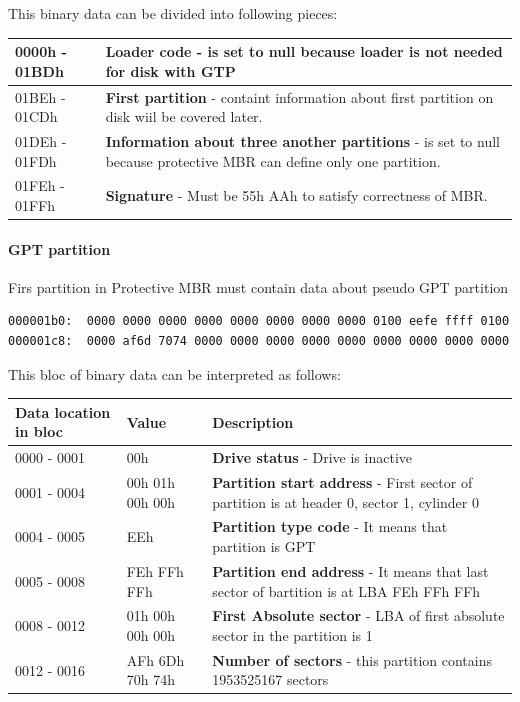 \documentclass[a4paper,11pt]{article}
\theoremstyle{mytheor}
\begin{document}
This binary data can be divided into following pieces:

\begin{tabular}{| p{3cm} | p{12cm} |} \hline
  0000h - 01BDh & \textbf{Loader code} - is set to null because loader is not needed for disk with GTP\\ \hline
  01BEh - 01CDh & \textbf{First partition} - containt information about first partition on disk wiil be covered later.\\ \hline
  01DEh - 01FDh & \textbf{Information about three another partitions} - is set to null because protective MBR can define only one partition.\\ \hline
  01FEh - 01FFh & \textbf{Signature} - Must be 55h AAh to satisfy correctness of MBR.\\ \hline
\end{tabular}

\paragraph{GPT partition}

Firs partition in Protective MBR must contain data about pseudo GPT partition
\begin{lstlisting}
000001b0:  0000 0000 0000 0000 0000 0000 0000 0000 0100 eefe ffff 0100
000001c8:  0000 af6d 7074 0000 0000 0000 0000 0000 0000 0000 0000 0000
\end{lstlisting}

This bloc of binary data can be interpreted as follows: 

\begin{tabular}{| p{3cm} | p{2cm} | p{10cm} |} \hline
  Data location in bloc & Value & Description\\ \hline
  0000 - 0001 & 00h & \textbf{Drive status} - Drive is inactive\\ \hline
  0001 - 0004 & 00h 01h 00h 00h & \textbf{Partition start address} - First sector of partition is at header 0, sector 1, cylinder 0\\ \hline
  0004 - 0005 & EEh & \textbf{Partition type code} - It means that partition is GPT\\ \hline
  0005 - 0008 & FEh FFh FFh & \textbf{Partition end address} - It means that last sector of bartition is at LBA FEh FFh FFh \\ \hline
  0008 - 0012 & 01h 00h 00h 00h & \textbf{First Absolute sector} - LBA of first absolute sector in the partition is 1 \\ \hline
  0012 - 0016 & AFh 6Dh 70h 74h & \textbf{Number of sectors} - this partition contains 1953525167 sectors\\ \hline
\end{tabular}
\end{document}
